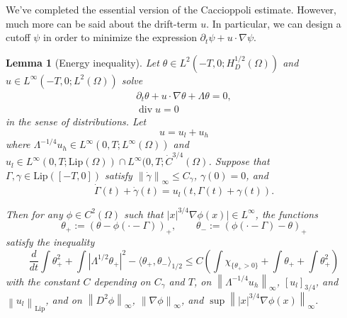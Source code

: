 \documentclass[11pt]{amsart}
\newtheorem{lemma}[theorem]{Lemma}
\theoremstyle{remark}
\theoremstyle{definition}
\newcommand{\chevron}[1]{\langle #1 \rangle}
\newcommand{\norm}[1]{\left\lVert#1\right\rVert}
\newcommand{\paren}[1]{\left( #1 \right)}
\newcommand{\bracket}[1]{\left[ #1 \right]}
\newcommand{\abs}[1]{\left\lvert #1 \right\rvert}
\newcommand{\del}{\partial}
\newcommand{\grad}{\nabla}
\newcommand{\ddt}{\frac{d}{dt}}
\renewcommand{\div}{\operatorname{div}}
\newcommand{\Lip}{\text{Lip}}
\newcommand{\indic}[1]{\chi_{\{#1\}}}
\newcommand{\ulow}{u_l}
\newcommand{\uhigh}{u_h}
\begin{document}
We've completed the essential version of the Caccioppoli estimate.  However, much more can be said about the drift-term $u$.  In particular, we can design a cutoff $\psi$ in order to minimize the expression $\del_t \psi + u\cdot\grad\psi$.  


\begin{lemma}[Energy inequality] \label{thm:energy inequality}
Let $\theta \in L^2(-T,0; H_D^{1/2}(\Omega))$ and $u \in L^\infty(-T,0; L^2(\Omega))$ solve
\begin{align*}
\del_t \theta + u\cdot \grad \theta + \Lambda \theta = 0,
\\ \div u = 0
\end{align*}
in the sense of distributions.  Let
\[ u = \ulow + \uhigh \]
where $\Lambda^{-1/4} \uhigh \in L^\infty(0,T; L^\infty(\Omega))$ and $\ulow \in L^\infty(0,T; \Lip(\Omega)) \cap L^\infty(0,T; \dot{C}^{3/4}(\Omega)$.  
Suppose that $\Gamma, \gamma \in \Lip([-T,0])$ satisfy $\norm{\dot{\gamma}}_\infty \leq C_\gamma$, $\gamma(0)=0$, and
\[ \dot{\Gamma}(t) + \dot{\gamma}(t) = \ulow(t, \Gamma(t) + \gamma(t)). \]

Then for any $\phi \in C^2(\Omega)$ such that $|x|^{3/4} \grad \phi(x)| \in L^\infty$, the functions
\[ \theta_+ := \paren{\theta - \phi(\cdot-\Gamma)}_+, \qquad \theta_- := \paren{\phi(\cdot-\Gamma) - \theta}_+ \]
satisfy the inequality
\[ \ddt \int \theta_+^2 + \int \abs{\Lambda^{1/2} \theta_+}^2 - \chevron{\theta_+,\theta_-}_{1/2} \leq C \paren{ \int \indic{\theta_+ > 0} + \int \theta_+ + \int \theta_+^2 } \]
with the constant $C$ depending on $C_\gamma$ and $T$, on $\norm{\Lambda^{-1/4} \uhigh}_\infty$, $\bracket{\ulow}_{3/4}$, and $\norm{\ulow}_\Lip$, and on $\norm{D^2 \phi}_\infty$, $\norm{\grad\phi}_\infty$, and $\sup \norm{|x|^{3/4} \grad\phi(x)}_\infty$.  
\end{lemma}
\end{document}
